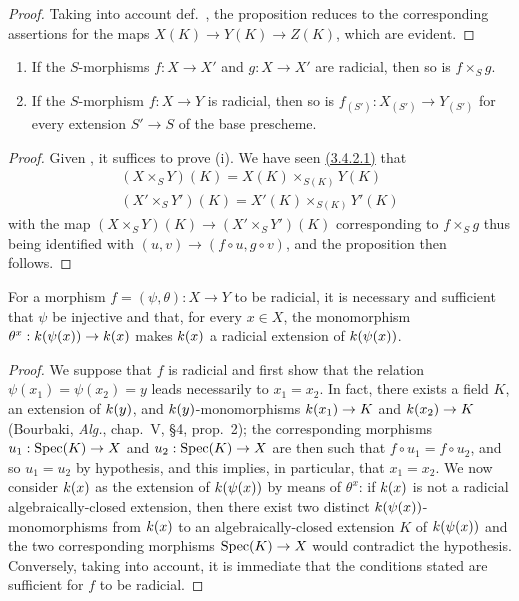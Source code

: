 \begin{proof}
\label{proof-1.3.5.6}
Taking into account def.~, the proposition reduces to the corresponding assertions for the maps $X(K)\to Y(K)\to Z(K)$, which are evident.
\end{proof}

\begin{prop}[3.5.7]
\label{1.3.5.7}
\medskip\noindent
\begin{enumerate}[label=\emph{(\roman*)}]
  \item If the $S$-morphisms $f:X\to X'$ and $g:X\to X'$ are radicial, then so is $f\times_S g$.
  \item If the $S$-morphism $f:X\to Y$ is radicial, then so is $f_{(S')}:X_{(S')}\to Y_{(S')}$ for every extension $S'\to S$ of the base prescheme.
\end{enumerate}
\end{prop}

\begin{proof}
\label{proof-1.3.5.7}
Given , it suffices to prove (i).
We have seen \hyperref[1.3.4.2.1]{(3.4.2.1)} that
\begin{gather*}
  (X\times_S Y)(K) = X(K)\times_{S(K)}Y(K)\\
  (X'\times_S Y')(K) = X'(K)\times_{S(K)}Y'(K)
\end{gather*}
with the map $(X\times_S Y)(K)\to(X'\times_S Y')(K)$ corresponding to $f\times_S g$ thus being identified with $(u,v)\to(f\circ u,g\circ v)$, and the proposition then follows.
\end{proof}

\begin{prop}[3.5.8]
\label{1.3.5.8}
For a morphism $f=(\psi,\theta):X\to Y$ to be radicial, it is necessary and sufficient that $\psi$ be injective and that, for every $x\in X$, the monomorphism $\theta^x:\kres(\psi(x))\to\kres(x)$ makes $k(x)$ a radicial extension of $k(\psi(x))$.
\end{prop}

\begin{proof}
\label{proof-1.3.5.8}
We suppose that $f$ is radicial and first show that the relation $\psi(x_1)=\psi(x_2)=y$ leads necessarily to $x_1=x_2$.
In fact, there exists a field $K$, an extension of $k(y)$, and $k(y)$-monomorphisms $\kres(x_1)\to K$ and $\kres(x_2)\to K$ (Bourbaki, \emph{Alg.}, chap.~V, §4, prop.~2); the corresponding morphisms $u_1:\Spec(K)\to X$ and $u_2:\Spec(K)\to X$ are then such that $f\circ u_1=f\circ u_2$, and so $u_1=u_2$ by hypothesis, and this implies, in particular, that $x_1=x_2$.
We now consider $k(x)$ as the extension of $k(\psi(x))$ by means of $\theta^x$: if $k(x)$ is not a radicial algebraically-closed extension, then there exist two distinct $k(\psi(x))$-monomorphisms from $k(x)$ to an algebraically-closed extension $K$ of $k(\psi(x))$ and the two corresponding morphisms $\Spec(K)\to X$ would contradict the hypothesis.
Conversely, taking  into account, it is immediate that the conditions stated are sufficient for $f$ to be radicial.
\end{proof}

